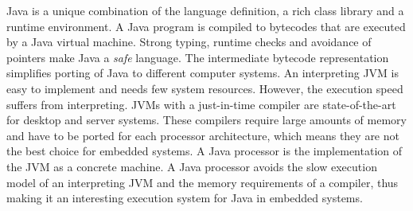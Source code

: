 Java is a unique combination of the language definition, a rich
class library and a runtime environment. A Java program is compiled
to bytecodes that are executed by a Java virtual machine. Strong
typing, runtime checks and avoidance of pointers make Java a
\emph{safe} language. The intermediate bytecode representation
simplifies porting of Java to different computer systems. An
interpreting JVM is easy to implement and needs few system
resources. However, the execution speed suffers from interpreting.
JVMs with a just-in-time compiler are state-of-the-art for desktop
and server systems. These compilers require large amounts of memory
and have to be ported for each processor architecture, which means
they are not the best choice for embedded systems. A Java processor
is the implementation of the JVM as a concrete machine. A Java
processor avoids the slow execution model of an interpreting JVM and
the memory requirements of a compiler, thus making it an interesting
execution system for Java in embedded systems.
